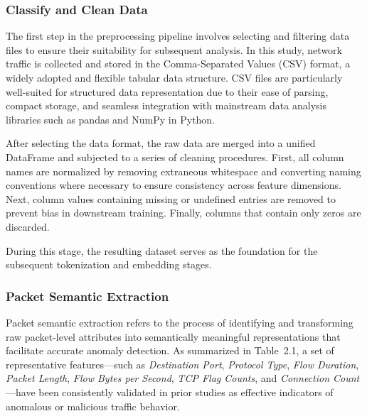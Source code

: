 \begin{ZhChapter}
    \subsubsection{Classify and Clean Data}

    The first step in the preprocessing pipeline involves selecting and filtering data files to ensure their suitability for subsequent analysis. In this study, network traffic is collected and stored in the Comma-Separated Values (CSV) format, a widely adopted and flexible tabular data structure. CSV files are particularly well-suited for structured data representation due to their ease of parsing, compact storage, and seamless integration with mainstream data analysis libraries such as pandas and NumPy in Python.

    After selecting the data format, the raw data are merged into a unified DataFrame and subjected to a series of cleaning procedures. First, all column names are normalized by removing extraneous whitespace and converting naming conventions where necessary to ensure consistency across feature dimensions. Next, column values containing missing or undefined entries are removed to prevent bias in downstream training. Finally, columns that contain only zeros are discarded.

    During this stage, the resulting dataset serves as the foundation for the subsequent tokenization and embedding stages.

    \subsubsection{Packet Semantic Extraction}

    Packet semantic extraction refers to the process of identifying and transforming raw packet-level attributes into semantically meaningful representations that facilitate accurate anomaly detection. As summarized in Table~2.1, a set of representative features—such as \textit{Destination Port}, \textit{Protocol Type}, \textit{Flow Duration}, \textit{Packet Length}, \textit{Flow Bytes per Second}, \textit{TCP Flag Counts}, and \textit{Connection Count}—have been consistently validated in prior studies as effective indicators of anomalous or malicious traffic behavior.






\end{ZhChapter}
